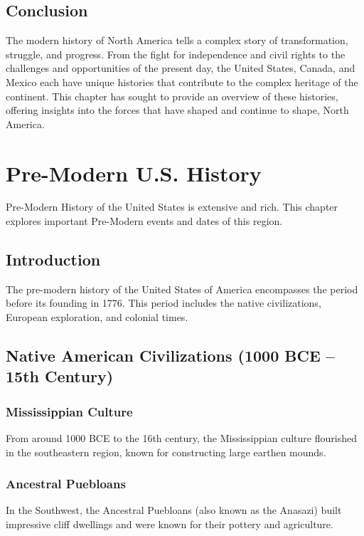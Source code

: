 \documentclass[a4paper,12pt]{book}
\begin{document}
\section{Conclusion}
\label{sec:conclusion-north-america-modern}
The modern history of North America tells a complex story of transformation, struggle, and progress. From the fight for independence and civil rights to the challenges and opportunities of the present day, the United States, Canada, and Mexico each have unique histories that contribute to the complex heritage of the continent. This chapter has sought to provide an overview of these histories, offering insights into the forces that have shaped and continue to shape, North America.

\chapter{Pre-Modern U.S. History}
\label{ch:pre-modern-us-history}

Pre-Modern History of the United States is extensive and rich. This chapter explores important Pre-Modern events and dates of this region.

\section{Introduction}
\label{sec:introduction-pre-modern-usa}
The pre-modern history of the United States of America encompasses the period before its founding in 1776. This period includes the native civilizations, European exploration, and colonial times.

\section{Native American Civilizations (1000 BCE – 15th Century)}
\label{sec:native-american-civilizations}
\subsection{Mississippian Culture}
\label{subsec:mississippian-culture}
From around 1000 BCE to the 16th century, the Mississippian culture flourished in the southeastern region, known for constructing large earthen mounds.

\subsection{Ancestral Puebloans}
\label{subsec:ancestral-puebloans}
In the Southwest, the Ancestral Puebloans (also known as the Anasazi) built impressive cliff dwellings and were known for their pottery and agriculture.
\end{document}
